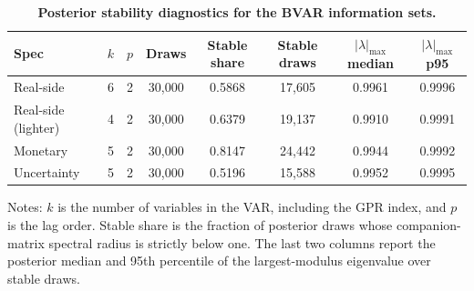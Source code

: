 \begin{table}[!htbp]
\centering
\scriptsize
\caption{\textbf{Posterior stability diagnostics for the BVAR information sets.}}
\label{tab:var_stability_info_sets}
\begin{tabular}{lccccccc}
\toprule
Spec & $k$ & $p$ & Draws & Stable share & Stable draws & $|\lambda|_{\max}$ median & $|\lambda|_{\max}$ p95 \\
\midrule
Real-side & 6 & 2 & 30,000 & 0.5868 & 17,605 & 0.9961 & 0.9996 \\
Real-side (lighter) & 4 & 2 & 30,000 & 0.6379 & 19,137 & 0.9910 & 0.9991 \\
Monetary & 5 & 2 & 30,000 & 0.8147 & 24,442 & 0.9944 & 0.9992 \\
Uncertainty & 5 & 2 & 30,000 & 0.5196 & 15,588 & 0.9952 & 0.9995 \\
\bottomrule
\end{tabular}
\begin{tablenotes}
\footnotesize
\item Notes: $k$ is the number of variables in the VAR, including the GPR index, and $p$ is the lag order. Stable share is the fraction of posterior draws whose companion-matrix spectral radius is strictly below one. The last two columns report the posterior median and 95th percentile of the largest-modulus eigenvalue over stable draws.
\end{tablenotes}
\end{table}
